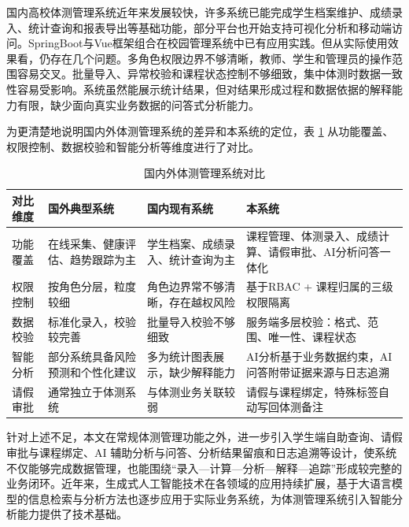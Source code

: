国内高校体测管理系统近年来发展较快，许多系统已能完成学生档案维护、成绩录入、统计查询和报表导出等基础功能，部分平台也开始支持可视化分析和移动端访问。SpringBoot与Vue框架组合在校园管理系统中已有应用实践\cite{yao2025staffmanage}。但从实际使用效果看，仍存在几个问题。多角色权限边界不够清晰，教师、学生和管理员的操作范围容易交叉。批量导入、异常校验和课程状态控制不够细致，集中体测时数据一致性容易受影响。系统虽然能展示统计结果，但对结果形成过程和数据依据的解释能力有限，缺少面向真实业务数据的问答式分析能力。

为更清楚地说明国内外体测管理系统的差异和本系统的定位，表 \ref{tab:domestic-foreign-comparison} 从功能覆盖、权限控制、数据校验和智能分析等维度进行了对比。

\begin{table}[H]
  \centering
  \caption{国内外体测管理系统对比}
  \label{tab:domestic-foreign-comparison}
  \footnotesize
  \renewcommand{\arraystretch}{1.35}
  \begin{tabularx}{\textwidth}{|p{2.2cm}|p{3.0cm}|p{3.0cm}|p{3.0cm}|}
    \hline
    对比维度 & 国外典型系统 & 国内现有系统 & 本系统 \\
    \hline
    功能覆盖 & 在线采集、健康评估、趋势跟踪为主 & 学生档案、成绩录入、统计查询为主 & 课程管理、体测录入、成绩计算、请假审批、AI分析问答一体化 \\
    \hline
    权限控制 & 按角色分层，粒度较细 & 角色边界常不够清晰，存在越权风险 & 基于RBAC + 课程归属的三级权限隔离 \\
    \hline
    数据校验 & 标准化录入，校验较完善 & 批量导入校验不够细致 & 服务端多层校验：格式、范围、唯一性、课程状态 \\
    \hline
    智能分析 & 部分系统具备风险预测和个性化建议 & 多为统计图表展示，缺少解释能力 & AI分析基于业务数据约束，AI问答附带证据来源与日志追溯 \\
    \hline
    请假审批 & 通常独立于体测系统 & 与体测业务关联较弱 & 请假与课程绑定，特殊标签自动写回体测备注 \\
    \hline
  \end{tabularx}
\end{table}

针对上述不足，本文在常规体测管理功能之外，进一步引入学生端自助查询、请假审批与课程绑定、AI 辅助分析与问答、分析结果留痕和日志追溯等设计，使系统不仅能够完成数据管理，也能围绕“录入—计算—分析—解释—追踪”形成较完整的业务闭环。近年来，生成式人工智能技术在各领域的应用持续扩展\cite{guo2025chatgpt}，基于大语言模型的信息检索与分析方法也逐步应用于实际业务系统\cite{xie2024llm}，为体测管理系统引入智能分析能力提供了技术基础。

